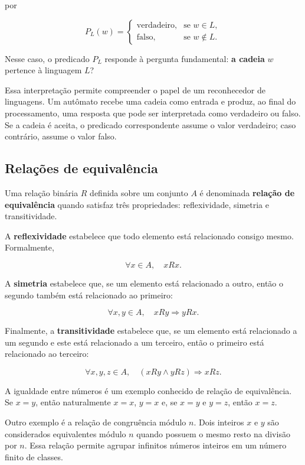 \documentclass[
  brazilian,
  letterpaper,
]{book}
\theoremstyle{plain}
\theoremstyle{definition}
\theoremstyle{remark}
\begin{document}
por

\[
P_L(w)=
\begin{cases}
\text{verdadeiro}, & \text{se }w\in L,\\
\text{falso}, & \text{se }w\notin L.
\end{cases}
\]

Nesse caso, o predicado \(P_L\) responde à pergunta fundamental:
\textbf{a cadeia} \(w\) pertence à linguagem \(L\)?

Essa interpretação permite compreender o papel de um reconhecedor de
linguagens. Um autômato recebe uma cadeia como entrada e produz, ao
final do processamento, uma resposta que pode ser interpretada como
verdadeiro ou falso. Se a cadeia é aceita, o predicado correspondente
assume o valor verdadeiro; caso contrário, assume o valor falso.

\subsection{Relações de
equivalência}\label{relauxe7uxf5es-de-equivaluxeancia}

Uma relação binária \(R\) definida sobre um conjunto \(A\) é denominada
\textbf{relação de equivalência} quando satisfaz três propriedades:
reflexividade, simetria e transitividade.

A \textbf{reflexividade} estabelece que todo elemento está relacionado
consigo mesmo. Formalmente,

\[
\forall x\in A,\quad xRx.
\]

A \textbf{simetria} estabelece que, se um elemento está relacionado a
outro, então o segundo também está relacionado ao primeiro:

\[
\forall x,y\in A,\quad
xRy\Rightarrow yRx.
\]

Finalmente, a \textbf{transitividade} estabelece que, se um elemento
está relacionado a um segundo e este está relacionado a um terceiro,
então o primeiro está relacionado ao terceiro:

\[
\forall x,y,z\in A,\quad
(xRy\land yRz)\Rightarrow xRz.
\]

A igualdade entre números é um exemplo conhecido de relação de
equivalência. Se \(x=y\), então naturalmente \(x=x\), \(y=x\) e, se
\(x=y\) e \(y=z\), então \(x=z\).

Outro exemplo é a relação de congruência módulo \(n\). Dois inteiros
\(x\) e \(y\) são considerados equivalentes módulo \(n\) quando possuem
o mesmo resto na divisão por \(n\). Essa relação permite agrupar
infinitos números inteiros em um número finito de classes.
\end{document}
